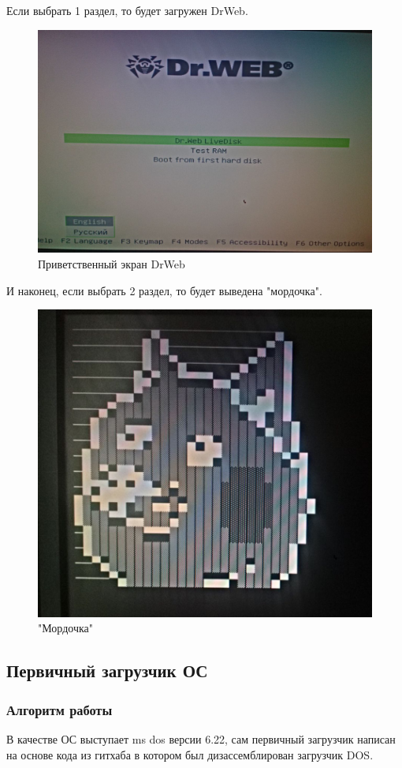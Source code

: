 Если выбрать 1 раздел, то будет загружен DrWeb.
\begin{figure}[H]
  \centering
  \includegraphics[width=.8\textwidth]{img/p3/testing/5}
  \caption{Приветственный экран DrWeb}
\end{figure}

И наконец, если выбрать 2 раздел, то будет выведена "мордочка".
\begin{figure}[H]
  \centering
  \includegraphics[width=.6\textwidth]{img/p3/testing/6}
  \caption{"Мордочка"}
\end{figure}



\subsection{Первичный загрузчик ОС}
\subsubsection{Алгоритм работы}
В качестве ОС выступает ms dos версии 6.22, сам первичный загрузчик написан на основе кода из гитхаба\cite{github} в котором был дизассемблирован загрузчик DOS.

